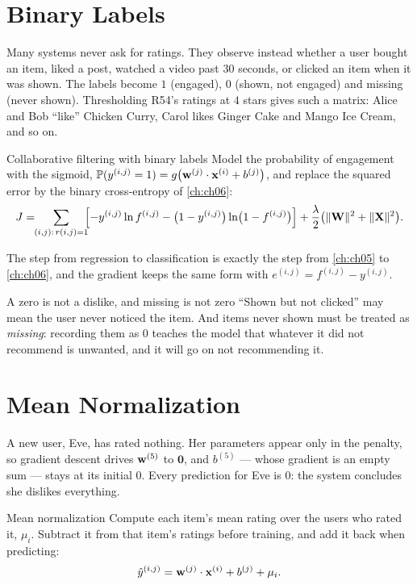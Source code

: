 \section{Binary Labels}
\label{sec:binary-cf}

Many systems never ask for ratings. They observe instead whether a user bought
an item, liked a post, watched a video past $30$ seconds, or clicked an item when
it was shown. The labels become $1$ (engaged), $0$ (shown, not engaged) and
missing (never shown). Thresholding R54's ratings at $4$ stars gives such a
matrix: Alice and Bob ``like'' Chicken Curry, Carol likes Ginger Cake and Mango
Ice Cream, and so on.

\begin{defbox}{Collaborative filtering with binary labels}
Model the probability of engagement with the sigmoid,
$\mathbb{P}(y^{(i,j)} = 1) = g\bigl(\mathbf{w}^{(j)}\cdot\mathbf{x}^{(i)} + b^{(j)}\bigr)$, and
replace the squared error by the binary cross-entropy of \cref{ch:ch06}:
\[
  J = \!\!\sum_{(i,j):\,r(i,j)=1}\!\!\Bigl[-y^{(i,j)}\ln f^{(i,j)} - \bigl(1-y^{(i,j)}\bigr)\ln\bigl(1-f^{(i,j)}\bigr)\Bigr]
    + \frac{\lambda}{2}\bigl(\|\mathbf{W}\|^2 + \|\mathbf{X}\|^2\bigr).
\]
\end{defbox}

The step from regression to classification is exactly the step from
\cref{ch:ch05} to \cref{ch:ch06}, and the gradient keeps the same form with
$e^{(i,j)} = f^{(i,j)} - y^{(i,j)}$.

\begin{pitfall}{A zero is not a dislike, and missing is not zero}
``Shown but not clicked'' may mean the user never noticed the item. And items
never shown must be treated as \emph{missing}: recording them as $0$ teaches the
model that whatever it did not recommend is unwanted, and it will go on not
recommending it.
\end{pitfall}

\section{Mean Normalization}
\label{sec:mean-norm}

A new user, Eve, has rated nothing. Her parameters appear only in the penalty, so
gradient descent drives $\mathbf{w}^{(5)}$ to $\mathbf{0}$, and $b^{(5)}$ --- whose
gradient is an empty sum --- stays at its initial $0$. Every prediction for Eve is
$0$: the system concludes she dislikes everything.

\begin{defbox}{Mean normalization}
Compute each item's mean rating over the users who rated it, $\mu_i$. Subtract it
from that item's ratings before training, and add it back when predicting:
\[
  \hat y^{(i,j)} = \mathbf{w}^{(j)}\cdot\mathbf{x}^{(i)} + b^{(j)} + \mu_i .
\]
\end{defbox}

